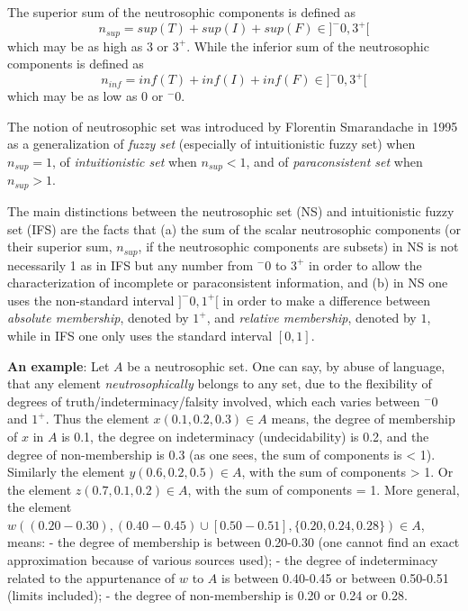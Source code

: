 \documentclass[12pt]{article}
\begin{document}
The superior sum of the neutrosophic components is defined as 
$$n_{sup} = sup(T) + sup(I) + sup(F) \in ] ^-0, 3^+[$$
which may be as high as 3 or $3^+$. 
\newline While the inferior sum of the neutrosophic components is defined as 
$$n_{inf} = inf(T) + inf(I) + inf(F) \in ] ^-0, 3^+[$$
\newline which may be as low as 0 or $^-0$.  

The notion of neutrosophic set was introduced by Florentin Smarandache in 1995 as a generalization of \emph{fuzzy set} (especially of intuitionistic fuzzy set) when $n_{sup} = 1$, of \emph{intuitionistic set} when $n_{sup} < 1$, and of \emph{paraconsistent set} when $n_{sup} > 1$.

The main distinctions between the neutrosophic set (NS) and intuitionistic fuzzy set (IFS) are the facts that (a) the sum of the scalar neutrosophic components (or their superior sum, $n_{sup}$, if the neutrosophic components are subsets) in NS is not necessarily 1 as in IFS but any number from $^-0$ to $3^+$ in order to allow the characterization of incomplete or paraconsistent information, and (b) in NS one uses the non-standard interval $]^-0, 1^+[$ in order to make a difference between \emph{absolute membership}, denoted by $1^+$, and \emph{relative membership}, denoted by $1$, while in IFS one only uses the standard interval $[0, 1]$.

{\bf An example}:
\newline Let $A$ be a neutrosophic set.
\newline One can say, by abuse of language, that any element \emph{neutrosophically} belongs to any set, due to the flexibility of degrees of truth/indeterminacy/falsity involved, which each varies between $^-0$ and $1^+$.
\newline Thus the element $x(0.1, 0.2, 0.3) \in A$ means, the degree of membership of $x$ in $A$ is 0.1, the degree on indeterminacy (undecidability) is 0.2, and the degree of non-membership is 0.3 (as one sees, the sum of components is < 1). 
\newline Similarly the element $y(0.6, 0.2, 0.5) \in A$, with the sum of components > 1.
\newline Or the element $z(0.7, 0.1, 0.2) \in A$, with the sum of components = 1.
\newline  More general, the element $w( (0.20-0.30), (0.40-0.45) \cup [0.50-0.51], \{0.20, 0.24, 0.28\} ) \in A$, means:
\newline - the degree of membership is between 0.20-0.30 (one cannot find an exact approximation because of various sources used);
\newline - the degree of indeterminacy related to the appurtenance of $w$ to $A$ is between 0.40-0.45 or between 0.50-0.51 (limits included);
\newline - the degree of non-membership is 0.20 or 0.24 or 0.28.
\end{document}
